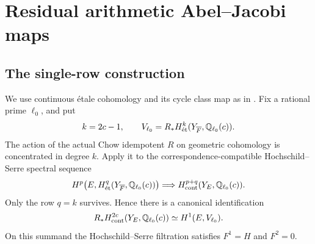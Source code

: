 \section{Residual arithmetic Abel--Jacobi maps}\label{sec:regulators}

\subsection{The single-row construction}\label{sec:regulator-proof}

We use continuous étale cohomology and its cycle class map as in
\cite{Raskind,Kahn}. Fix a rational prime \(\ell_0\), and put
\[
 k=2c-1,\qquad
 V_{\ell_0}=R_*H^k_{\et}(Y_{\Fbar},\Q_{\ell_0}(c)).
\]
The action of the actual Chow idempotent \(R\) on geometric
cohomology is concentrated in degree \(k\). Apply it to the
correspondence-compatible Hochschild--Serre spectral sequence
\[
 H^p\bigl(E,H^q_{\et}(Y_{\Fbar},\Q_{\ell_0}(c))\bigr)
 \Longrightarrow H^{p+q}_{\cont}(Y_E,\Q_{\ell_0}(c)).
\]
Only the row \(q=k\) survives. Hence there is a canonical
identification
\begin{equation}\label{eq:single-row}
 R_*H^{2c}_{\cont}(Y_E,\Q_{\ell_0}(c))
       \simeq H^1(E,V_{\ell_0}).
\end{equation}
On this summand the Hochschild--Serre filtration satisfies
\(F^1=H\) and \(F^2=0\).


